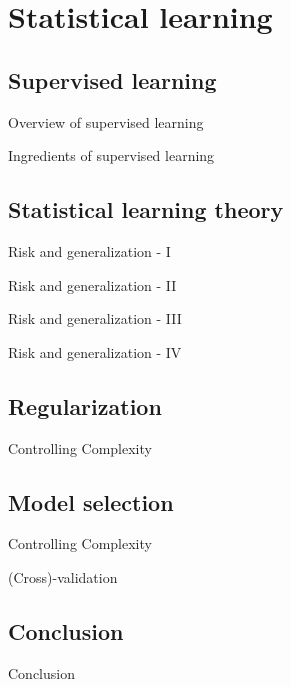 
\section{Statistical learning}
\subsection{Supervised learning}

\begin{frame}[t]{Overview of supervised learning}

\end{frame}

\begin{frame}[t]{Ingredients of supervised learning}

\end{frame}
\subsection{Statistical learning theory}
\begin{frame}[t]{Risk and generalization - I}

\end{frame}
\begin{frame}[t]{Risk and generalization - II}

\end{frame}
\begin{frame}[t]{Risk and generalization - III}

\end{frame}
\begin{frame}[t]{Risk and generalization - IV}

\end{frame}
\subsection{Regularization}
\begin{frame}[t]{Controlling Complexity}

\end{frame}

\subsection{Model selection}
\begin{frame}[t]{Controlling Complexity}

\end{frame}

\begin{frame}[t]{(Cross)-validation}

\end{frame}
\subsection{Conclusion}
\begin{frame}[t]{Conclusion}

\end{frame}